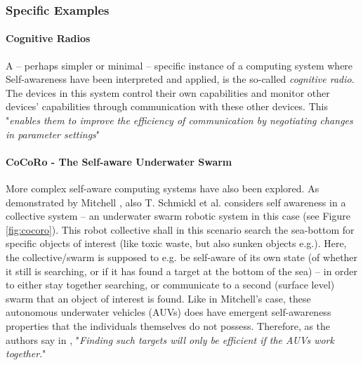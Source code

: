 		\subsubsection{Specific Examples}

			\paragraph{Cognitive Radios}

			A -- perhaps simpler or minimal -- specific instance of a computing system where Self-awareness have been interpreted and applied, is the so-called \textit{cognitive radio}. The devices in this system control their own capabilities and monitor other devices' capabilities through communication with these other devices. This "\textit{enables them to improve the efficiency of communication by negotiating changes in parameter settings}" \cite{sacs17_ch3}

			\paragraph{CoCoRo - The Self-aware Underwater Swarm}

			More complex self-aware computing systems have also been explored. As demonstrated by Mitchell \cite{mitchell}, also T. Schmickl et al. considers self awareness in a collective system -- an underwater swarm robotic system \cite{cocoro} in this case (see Figure \ref{fig:cocoro}). This robot collective shall in this scenario search the sea-bottom for specific objects of interest (like toxic waste, but also sunken objects e.g.). Here, the collective/swarm is supposed to e.g. be self-aware of its own state (of whether it still is searching, or if it has found a target at the bottom of the sea) -- in order to either stay together searching, or communicate to a second (surface level) swarm that an object of interest is found. Like in Mitchell's case, these autonomous underwater vehicles (AUVs) does have emergent self-awareness properties that the individuals themselves do not possess. Therefore, as the authors say in \cite{cocoro}, "\textit{Finding such targets will only be efficient if the AUVs work together}."

